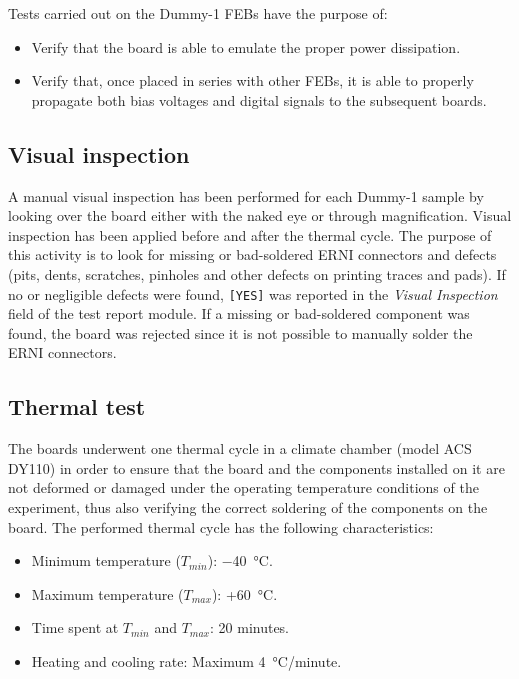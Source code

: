 \par
Tests carried out on the Dummy-1 FEBs have the purpose of:

\begin{itemize}
    \itemsep0em 
    \item Verify that the board is able to emulate the proper power dissipation.
    \item Verify that, once placed in series with other FEBs, it is able to properly propagate both bias voltages and digital signals to the subsequent boards.
\end{itemize}


\subsection{Visual inspection}
A manual visual inspection has been performed for each Dummy-1 sample by looking over the board either with the naked eye or through magnification. Visual inspection has been applied before and after the thermal cycle. The purpose of this activity is to look for missing or bad-soldered ERNI connectors and defects (pits, dents, scratches, pinholes and other defects on printing traces and pads). If no or negligible defects were found, \texttt{[YES]} was reported in the \textit{Visual Inspection} field of the test report module. If a missing or bad-soldered component was found, the board was rejected since it is not possible to manually solder the ERNI connectors.


\subsection{Thermal test} \label{subsection-thermal}
The boards underwent one thermal cycle in a climate chamber (model ACS DY110) in order to ensure that the board and the components installed on it are not deformed or damaged under the operating temperature conditions of the experiment, thus also verifying the correct soldering of the components on the board. The performed thermal cycle has the following characteristics:

\begin{itemize}
    \itemsep0em 
    \item Minimum temperature (\texttt{$T_{min}$}): \SI{-40}{\celsius}.
    \item Maximum temperature (\texttt{$T_{max}$}): +\SI{60}{\celsius}.
    \item Time spent at $T_{min}$ and $T_{max}$: 20 minutes.
    \item Heating and cooling rate: Maximum \SI{4}{\celsius/minute}.
\end{itemize}

